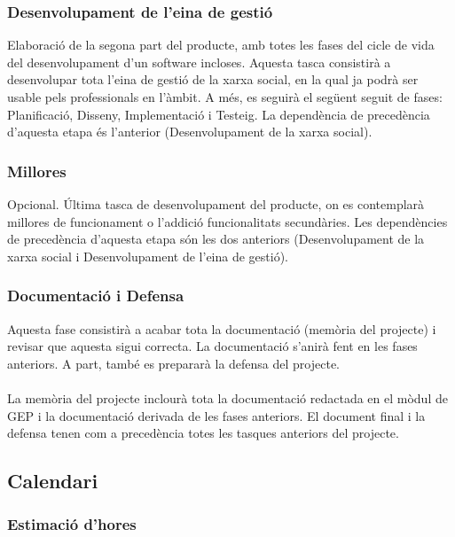 \documentclass[11pt,catalan,listoffigures,listoftables]{tfgetsinf}
\begin{document}
\subsubsection{Desenvolupament de l’eina de gestió}
Elaboració de la segona part del producte, amb totes les fases del cicle de vida del desenvolupament d’un software incloses. Aquesta tasca consistirà a desenvolupar tota l’eina de gestió de la xarxa social, en la qual ja podrà ser usable pels professionals en l’àmbit. A més, es seguirà el següent seguit de fases: Planificació, Disseny, Implementació i Testeig. La dependència de precedència d’aquesta etapa és l’anterior (Desenvolupament de la xarxa social).

\subsubsection{Millores}
Opcional. Última tasca de desenvolupament del producte, on es contemplarà millores de funcionament o l’addició funcionalitats secundàries. Les dependències de precedència d’aquesta etapa són les dos anteriors (Desenvolupament de la xarxa social i Desenvolupament de l’eina de gestió).

\subsubsection{Documentació i Defensa}
Aquesta fase consistirà a acabar tota la documentació (memòria del projecte) i revisar que aquesta sigui correcta. La documentació s’anirà fent en les fases anteriors. A part, també es prepararà la defensa del projecte.\\ \\
La memòria del projecte inclourà tota la documentació redactada en el mòdul de GEP i la documentació derivada de les fases anteriors. El document final i la defensa tenen com a precedència totes les tasques anteriors del projecte.
\newpage
\subsection{Calendari}

\subsubsection{Estimació d'hores}
\end{document}

